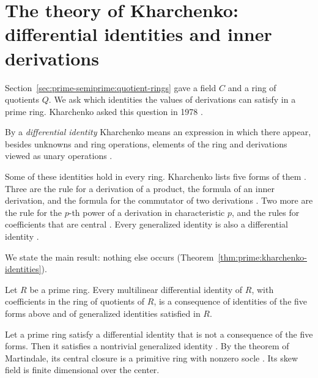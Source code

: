 \section{The theory of Kharchenko: differential identities and inner derivations}\label{sec:prime-semiprime:kharchenko}

Section~\ref{sec:prime-semiprime:quotient-rings} gave a field $C$ and a ring of
quotients $Q$. We ask which identities the values of derivations can satisfy in a
prime ring. Kharchenko asked this question in 1978 \cite[p.~155]{Kharchenko1978}.

By a \emph{differential identity} Kharchenko means an expression in which there
appear, besides unknowns and ring operations, elements of the ring and
derivations viewed as unary operations \cite[p.~155]{Kharchenko1978}.

Some of these identities hold in every ring. Kharchenko lists five forms of them
\cite[p.~155]{Kharchenko1978}. Three are the rule for a derivation of a product,
the formula of an inner derivation, and the formula for the commutator of two
derivations \cite[p.~155]{Kharchenko1978}. Two more are the rule for the $p$-th
power of a derivation in characteristic $p$, and the rules for coefficients that
are central \cite[p.~155]{Kharchenko1978}. Every generalized identity is also a
differential identity \cite[p.~155]{Kharchenko1978}.

We state the main result: nothing else occurs (Theorem~\ref{thm:prime:kharchenko-identities}).

\begin{theorem}\label{thm:prime:kharchenko-identities}
Let $R$ be a prime ring. Every multilinear differential identity of $R$, with
coefficients in the ring of quotients of $R$, is a consequence of identities of the
five forms above and of generalized identities satisfied in $R$.
\end{theorem}

Let a prime ring satisfy a differential identity that is not a consequence of the
five forms. Then it satisfies a nontrivial generalized identity
\cite[p.~155]{Kharchenko1978}. By the theorem of Martindale, its central closure
is a primitive ring with nonzero socle \cite[p.~155]{Kharchenko1978}. Its skew
field is finite dimensional over the center.

